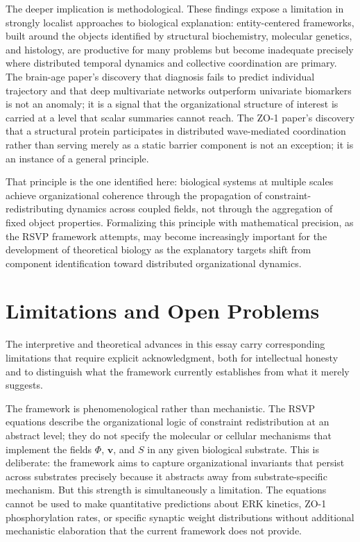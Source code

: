 \documentclass[11pt,a4paper]{article}
\theoremstyle{plain}
\theoremstyle{definition}
\begin{document}
The deeper implication is methodological. These findings expose a limitation in
strongly localist approaches to biological explanation: entity-centered frameworks,
built around the objects identified by structural biochemistry, molecular genetics, and
histology, are productive for many problems but become inadequate precisely where
distributed temporal dynamics and collective coordination are primary. The brain-age
paper's discovery that diagnosis fails to predict individual trajectory and that deep
multivariate networks outperform univariate biomarkers is not an anomaly; it is a signal
that the organizational structure of interest is carried at a level that scalar summaries
cannot reach. The ZO-1 paper's discovery that a structural protein participates in
distributed wave-mediated coordination rather than serving merely as a static barrier
component is not an exception; it is an instance of a general principle.

That principle is the one identified here: biological systems at multiple scales achieve
organizational coherence through the propagation of constraint-redistributing dynamics
across coupled fields, not through the aggregation of fixed object properties. Formalizing
this principle with mathematical precision, as the RSVP framework attempts, may become
increasingly important for the development of theoretical biology as the explanatory
targets shift from component identification toward distributed organizational dynamics.

\section{Limitations and Open Problems}
\label{sec:limitations}

The interpretive and theoretical advances in this essay carry corresponding limitations
that require explicit acknowledgment, both for intellectual honesty and to distinguish
what the framework currently establishes from what it merely suggests.

The framework is phenomenological rather than mechanistic. The RSVP equations describe
the organizational logic of constraint redistribution at an abstract level; they do not
specify the molecular or cellular mechanisms that implement the fields $\Phi$, $\mathbf{v}$,
and $S$ in any given biological substrate. This is deliberate: the framework aims to
capture organizational invariants that persist across substrates precisely because it
abstracts away from substrate-specific mechanism. But this strength is simultaneously
a limitation. The equations cannot be used to make quantitative predictions about ERK
kinetics, ZO-1 phosphorylation rates, or specific synaptic weight distributions without
additional mechanistic elaboration that the current framework does not provide.
\end{document}
